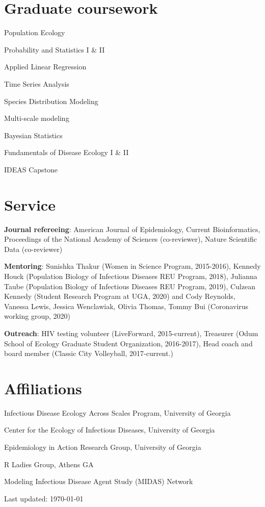 \documentclass[letterpaper]{article}
\def\footerlink{}
\renewenvironment{itemize}{
  \begin{list}{}{
    \setlength{\leftmargin}{1.5em}
  }
}{
  \end{list}
}
\begin{document}
\section*{Graduate coursework}
\begin{multicols}{2}
\begin{itemize}
\item Population Ecology
\item Probability and Statistics I \& II
\item Applied Linear Regression
\item Time Series Analysis 
\item Species Distribution Modeling
\item Multi-scale modeling
\item Bayesian Statistics
\item Fundamentals of Disease Ecology I \& II
\item IDEAS Capstone 
\end{itemize}
\end{multicols}

\section*{Service}
\begin{itemize}
\item \textbf{Journal refereeing}: American Journal of Epidemiology, Current Bioinformatics, Proceedings of the National Academy of Sciences (co-reviewer), Nature Scientific Data (co-reviewer)
\item \textbf{Mentoring}: Sunishka Thakur (Women in Science Program, 2015-2016), Kennedy Houck (Population Biology of Infectious Diseases REU Program, 2018), Julianna Taube (Population Biology of Infectious Diseases REU Program, 2019), Culzean Kennedy (Student Research Program at UGA, 2020) and Cody Reynolds, Vanessa Lewis, Jessica Wenclawiak, Olivia Thomas, Tommy Bui (Coronavirus working group, 2020)
\item \textbf{Outreach}: HIV testing volunteer (LiveForward, 2015-current),  Treasurer (Odum School of Ecology Graduate Student Organization, 2016-2017), Head coach and board member (Classic City Volleyball, 2017-current.) 
\end{itemize}

\section*{Affiliations}
\begin{itemize}
\item Infectious Disease Ecology Across Scales Program, University of Georgia  
\item Center for the Ecology of Infectious Diseases, University of Georgia 
\item Epidemiology in Action Research Group, University of Georgia 
\item R Ladies Group, Athens GA 
\item Modeling Infectious Disease Agent Study (MIDAS) Network

\end{itemize}

\bigskip

\begin{center}
  \begin{footnotesize}
    Last updated: \today \\
    \href{\footerlink}{\texttt{\footerlink}}
  \end{footnotesize}
\end{center}
\end{document}
